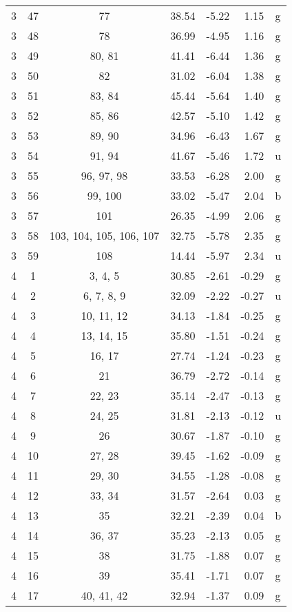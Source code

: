\begin{center}
\begin{longtable}{cccrrrc}
  3 & 47 & 77 & 38.54 & -5.22 &  1.15 & g\\
  3 & 48 & 78 & 36.99 & -4.95 &  1.16 & g\\
  3 & 49 & 80, 81 & 41.41 & -6.44 &  1.36 & g\\
  3 & 50 & 82 & 31.02 & -6.04 &  1.38 & g\\
  3 & 51 & 83, 84 & 45.44 & -5.64 &  1.40 & g\\
  3 & 52 & 85, 86 & 42.57 & -5.10 &  1.42 & g\\
  3 & 53 & 89, 90 & 34.96 & -6.43 &  1.67 & g\\
  3 & 54 & 91, 94 & 41.67 & -5.46 &  1.72 & u\\
  3 & 55 & 96, 97, 98 & 33.53 & -6.28 &  2.00 & g\\
  3 & 56 & 99, 100 & 33.02 & -5.47 &  2.04 & b\\
  3 & 57 & 101 & 26.35 & -4.99 &  2.06 & g\\
  3 & 58 & 103, 104, 105, 106, 107 & 32.75 & -5.78 &  2.35 & g\\
  3 & 59 & 108 & 14.44 & -5.97 &  2.34 & u\\
  4 & 1 & 3, 4, 5 & 30.85 & -2.61 & -0.29 & g\\
  4 & 2 & 6, 7, 8, 9 & 32.09 & -2.22 & -0.27 & u\\
  4 & 3 & 10, 11, 12 & 34.13 & -1.84 & -0.25 & g\\
  4 & 4 & 13, 14, 15 & 35.80 & -1.51 & -0.24 & g\\
  4 & 5 & 16, 17 & 27.74 & -1.24 & -0.23 & g\\
  4 & 6 & 21 & 36.79 & -2.72 & -0.14 & g\\
  4 & 7 & 22, 23 & 35.14 & -2.47 & -0.13 & g\\
  4 & 8 & 24, 25 & 31.81 & -2.13 & -0.12 & u\\
  4 & 9 & 26 & 30.67 & -1.87 & -0.10 & g\\
  4 & 10 & 27, 28 & 39.45 & -1.62 & -0.09 & g\\
  4 & 11 & 29, 30 & 34.55 & -1.28 & -0.08 & g\\
  4 & 12 & 33, 34 & 31.57 & -2.64 &  0.03 & g\\
  4 & 13 & 35 & 32.21 & -2.39 &  0.04 & b\\
  4 & 14 & 36, 37 & 35.23 & -2.13 &  0.05 & g\\
  4 & 15 & 38 & 31.75 & -1.88 &  0.07 & g\\
  4 & 16 & 39 & 35.41 & -1.71 &  0.07 & g\\
  4 & 17 & 40, 41, 42 & 32.94 & -1.37 &  0.09 & g\\

\end{longtable}
\end{center}

